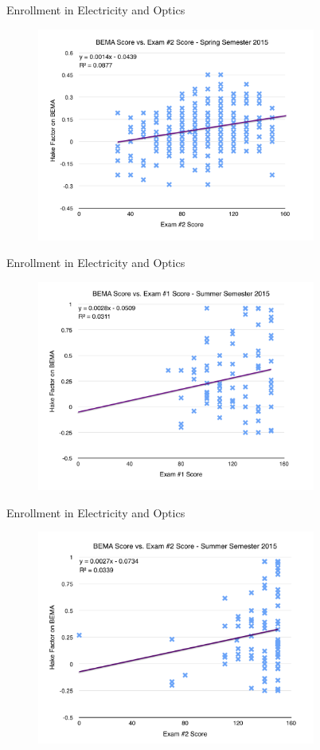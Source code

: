 \documentclass{beamer}
\begin{document}
\begin{frame}{Enrollment in Electricity and Optics}
\begin{figure}
	\includegraphics[width=3.6in]{img/chapter4/bema_vs_ex2_sp15}
\end{figure}
\end{frame}

\begin{frame}{Enrollment in Electricity and Optics}
\begin{figure}
	\includegraphics[width=3.6in]{img/chapter4/bema_vs_ex1_su15}
\end{figure}
\end{frame}

\begin{frame}{Enrollment in Electricity and Optics}
\begin{figure}
	\includegraphics[width=3.6in]{img/chapter4/bema_vs_ex2_su15}
\end{figure}
\end{frame}
\end{document}
